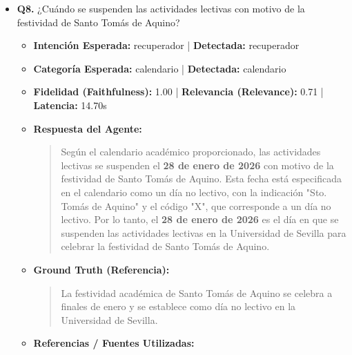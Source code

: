 \documentclass[12pt,a4paper,oneside]{report}
\begin{document}
\begin{itemize}
\begin{itemize}
\begin{itemize}
                  \item \href{https://cat.us.es/sites/default/files/2025-03/calendario-academico-2025-2026-cg.pdf}{Calendario Académico 2025-2026 - CAT-US}
                  \item BOJA25-508-00085-6229-01\_00319829.pdf (Página 44)
                  \item \href{https://www.us.es/sites/default/files/2025-03/CALENDARIO+ACADÉMICO+2025-2026+CG.pdf}{CALENDARIO ACADÉMICO 2025-2026 CG.pdf}
                \end{itemize}
        \end{itemize}

  
\item \textbf{Q8.} ¿Cuándo se suspenden las actividades lectivas con motivo de la festividad de Santo Tomás de Aquino? \\
        \begin{itemize}
          \item \textbf{Intención Esperada:} recuperador | \textbf{Detectada:} recuperador
          \item \textbf{Categoría Esperada:} calendario | \textbf{Detectada:} calendario
          \item \textbf{Fidelidad (Faithfulness):} 1.00 | \textbf{Relevancia (Relevance):} 0.71 | \textbf{Latencia:} 14.70s
          \item \textbf{{Respuesta del Agente:}} \\
                \begin{quote}
Según el calendario académico proporcionado, las actividades lectivas se suspenden el \textbf{28 de enero de 2026} con motivo de la festividad de Santo Tomás de Aquino. Esta fecha está especificada en el calendario como un día no lectivo, con la indicación "Sto. Tomás de Aquino" y el código "X", que corresponde a un día no lectivo. Por lo tanto, el \textbf{28 de enero de 2026} es el día en que se suspenden las actividades lectivas en la Universidad de Sevilla para celebrar la festividad de Santo Tomás de Aquino.
                \end{quote}
          \item \textbf{{Ground Truth (Referencia):}} \\
                \begin{quote}
La festividad académica de Santo Tomás de Aquino se celebra a finales de enero y se establece como día no lectivo en la Universidad de Sevilla.
                \end{quote}
          \item \textbf{{Referencias / Fuentes Utilizadas:}} \\

\end{itemize}
\end{itemize}
\end{document}
